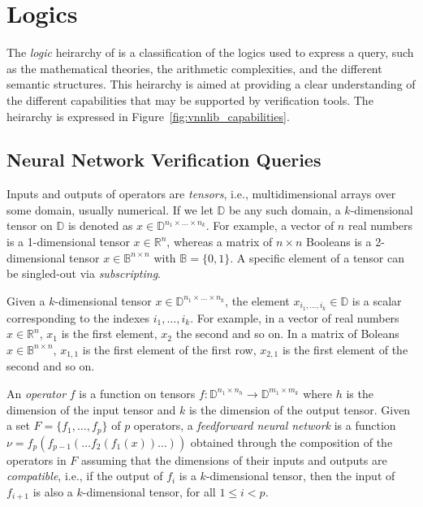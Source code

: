 
\chapter{Logics}
\label{sec:query_categories}

The \textit{logic} heirarchy of \vnnlib{} is a classification of the logics used to 
express a query, such as the mathematical theories, the arithmetic complexities, 
and the different semantic structures. This heirarchy is aimed at providing a clear understanding 
of the different capabilities that may be supported by verification tools. The heirarchy 
is expressed in Figure~\ref{fig:vnnlib_capabilities}.

\section{Neural Network Verification Queries}

Inputs and outputs of operators are \emph{tensors}, i.e.,
multidimensional arrays over some domain, usually numerical. 
If we let $\mathbb{D}$ be any such domain, a $k$-dimensional 
tensor on $\mathbb{D}$ is denoted as $x \in \mathbb{D}^{n_1 
	\times \ldots \times n_k}$.
For example, a vector of $n$ real numbers is a 1-dimensional
tensor $x \in \mathbb{R}^n$, whereas a matrix of $n \times n$ 
Booleans is a 2-dimensional tensor $x \in \mathbb{B}^{n 
	\times n}$ with $\mathbb{B} = \{0, 1\}$. A specific element 
of a tensor can be singled-out via \emph{subscripting}. 

Given a $k$-dimensional tensor $x \in \mathbb{D}^{n_1 \times 
	\ldots \times n_k}$, the element $x_{i_1, \ldots, i_k} \in 
	\mathbb{D}$ is a scalar corresponding to the indexes 
${i_1, \ldots, i_k}$. For example, in a vector of real numbers 
$x \in \mathbb{R}^n$, $x_1$ is the first element, $x_2$ the second 
and so on. In a matrix of Boleans $x \in \mathbb{B}^{n \times
  n}$, $x_{1,1}$ is the first element of the first row, $x_{2,1}$ 
is the first element of the second and so on.

An \emph{operator} $f$ is a function on tensors 
$f: \mathbb{D}^{n_{1} \times n_h} \to \mathbb{D}^{m_{1} \times m_k}$
where $h$ is the dimension of the input tensor and $k$ is the 
dimension of the output tensor. Given a set $F = \{f_1, \ldots, 
	f_p\}$ of $p$ operators, a \emph{feedforward neural network}
is a function $\nu = f_p(f_{p-1}(\ldots f_2(f_1(x))\ldots))$ obtained
through the composition of the operators in $F$ assuming that the 
dimensions of their inputs and outputs are \emph{compatible}, i.e.,
if the  output of $f_i$ is a $k$-dimensional tensor, then the input
of $f_{i+1}$ is also a $k$-dimensional tensor, for all $1 \leq i < p$.

